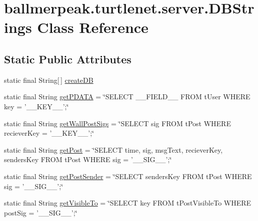 \hypertarget{classballmerpeak_1_1turtlenet_1_1server_1_1DBStrings}{\section{ballmerpeak.\-turtlenet.\-server.\-D\-B\-Strings Class Reference}
\label{classballmerpeak_1_1turtlenet_1_1server_1_1DBStrings}
}
\subsection*{Static Public Attributes}
\begin{DoxyCompactItemize}
\item 
static final String\mbox{[}$\,$\mbox{]} \hyperlink{classballmerpeak_1_1turtlenet_1_1server_1_1DBStrings_a70ba551ea4397e98cc09b96eb0d9ff43}{create\-D\-B}
\item 
static final String \hyperlink{classballmerpeak_1_1turtlenet_1_1server_1_1DBStrings_a93ae46feb4aaeb78cac2ba7b4fce04ec}{get\-P\-D\-A\-T\-A} = \char`\"{}S\-E\-L\-E\-C\-T \-\_\-\-\_\-\-F\-I\-E\-L\-D\-\_\-\-\_\- F\-R\-O\-M t\-User W\-H\-E\-R\-E key = '\-\_\-\-\_\-\-K\-E\-Y\-\_\-\-\_\-';\char`\"{}
\item 
static final String \hyperlink{classballmerpeak_1_1turtlenet_1_1server_1_1DBStrings_abc7b51ce40123124593dc92582e256b0}{get\-Wall\-Post\-Sigs} = \char`\"{}S\-E\-L\-E\-C\-T sig F\-R\-O\-M t\-Post W\-H\-E\-R\-E reciever\-Key = '\-\_\-\-\_\-\-K\-E\-Y\-\_\-\-\_\-';\char`\"{}
\item 
static final String \hyperlink{classballmerpeak_1_1turtlenet_1_1server_1_1DBStrings_a80f3d94ed94b75193a7fd3490548739b}{get\-Post} = \char`\"{}S\-E\-L\-E\-C\-T time, sig, msg\-Text, reciever\-Key, senders\-Key F\-R\-O\-M t\-Post W\-H\-E\-R\-E sig = '\-\_\-\-\_\-\-S\-I\-G\-\_\-\-\_\-';\char`\"{}
\item 
static final String \hyperlink{classballmerpeak_1_1turtlenet_1_1server_1_1DBStrings_ad87c5a646e57a7280c16bc34c599eba2}{get\-Post\-Sender} = \char`\"{}S\-E\-L\-E\-C\-T senders\-Key F\-R\-O\-M t\-Post W\-H\-E\-R\-E sig = '\-\_\-\-\_\-\-S\-I\-G\-\_\-\-\_\-';\char`\"{}
\item 
static final String \hyperlink{classballmerpeak_1_1turtlenet_1_1server_1_1DBStrings_a977f96408405a039b29ea0375f014129}{get\-Visible\-To} = \char`\"{}S\-E\-L\-E\-C\-T key F\-R\-O\-M t\-Post\-Visible\-To W\-H\-E\-R\-E post\-Sig = '\-\_\-\-\_\-\-S\-I\-G\-\_\-\-\_\-';\char`\"{}
\item 

\end{DoxyCompactItemize}
